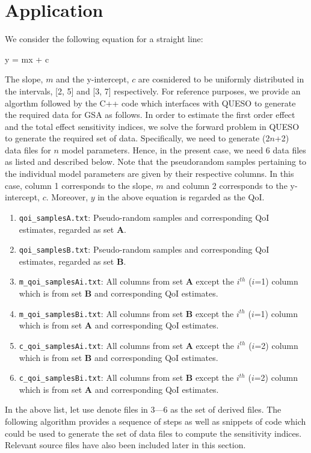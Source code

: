 \section{Application}
\label{sec:app}

We consider the following equation for a straight line:

\be y = mx + c \ee

The slope, $m$ and the y-intercept, $c$ are cosnidered to be uniformly distributed in the intervals,
[2, 5] and [3, 7] respectively. For reference purposes, we provide an algorthm followed by the
C++ code which interfaces with QUESO to generate the required data for GSA as follows.
In order to estimate the first order effect and the total effect sensitivity indices, we solve
the forward problem in QUESO to generate the required set of data. Specifically, we need to generate
(2$n$+2) data files for $n$ model parameters. Hence, in the present case, we need 6 data files as 
listed and described below. Note that the pseudorandom samples pertaining to the  individual model parameters
are given by their respective columns. In this case, column 1 corresponds to the slope, $m$ and column 2
corresponds to the y-intercept, $c$. Moreover, $y$ in the above equation is regarded as the QoI. 

\begin{enumerate}
\item \texttt{qoi\_samplesA.txt}: Pseudo-random samples and corresponding QoI estimates, regarded as set $\bm A$. 
\item \texttt{qoi\_samplesB.txt}: Pseudo-random samples and corresponding QoI estimates, regarded as set $\bm B$.
\item \texttt{m\_qoi\_samplesAi.txt}: All columns from set $\bm A$ except the $i^{th}$ ($i$=1) column which is from
set $\bm B$ and corresponding QoI estimates.
\item \texttt{m\_qoi\_samplesBi.txt}: All columns from set $\bm B$ except the $i^{th}$ ($i$=1) column which is from
set $\bm A$ and corresponding QoI estimates.
\item \texttt{c\_qoi\_samplesAi.txt}: All columns from set $\bm A$ except the $i^{th}$ ($i$=2) column which is from
set $\bm B$ and corresponding QoI estimates.
\item \texttt{c\_qoi\_samplesBi.txt}: All columns from set $\bm B$ except the $i^{th}$ ($i$=2) column which is from
set $\bm A$ and corresponding QoI estimates.
\end{enumerate}

In the above list, let use denote files in 3---6 as the set of derived files.  The following algorithm provides
a sequence of steps as well as snippets of code which could be used to
generate the set of data files to compute the sensitivity indices. Relevant source
files have also been included later in this section.  

